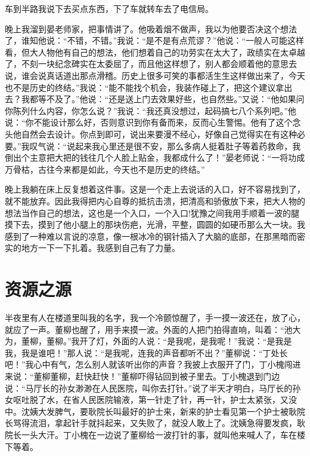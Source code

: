 \documentclass[12pt,oneside]{book}
\begin{document}
车到半路我说下去买点东西，下了车就转车去了电信局。

晚上我溜到晏老师家，把事情讲了。他吸着烟不做声，我以为他要否决这个想法了，谁知他说：``不错，不错。''我说：``是不是有点荒谬？''他说：``一般人可能这样看，但大人物他有自己的想法，他们想着自己的功劳实在太大了，政绩实在太卓越了，不刻一块纪念碑实在太委屈了，而且他这样想了，别人都会顺着他的意思去说，谁会说真话道出那点滑稽。历史上很多可笑的事都活生生这样做出来了，今天也不是历史的终结。''我说：``能不能找个机会，我装作碰上了，把这个建议拿出去？我都等不及了。''他说：``还是送上门去效果好些，也自然些。''又说：``他如果问你陈列什么内容，你怎么说？''我说：``我还真没想过，起码搞七八个系列吧。''他说：``你不能设计那么好，否则意识到你有备而来，反而心生警惕。他有了这个念头他自然会去设计。你点到即可，说出来要漫不经心，好像自己觉得实在有这种必要。''我叹气说：``说起来我心里还是很不安，那么多病人挺着肚子等着药救命，我倒出个主意把大把的钱往几个人脸上贴金，我都成什么了！''晏老师说：``一将功成万骨枯，古往今来都是如此，今天也不是历史的终结。''

晚上我躺在床上反复想着这件事。这是一个走上去说话的入口，好不容易找到了，就不能放弃。因此我得把内心自尊的抵抗击溃，把清高和骄傲放下来，把大人物的想法当作自己的想法，这也是一个入口，一个入口!犹豫之间我用手顺着一波的腿摸下去，摸到了他小腿上的那块伤疤，光滑，平整，圆圆的如硬币那么大一块。我感到了一种难以言说的凉意，像一根冰冷的钢针插入了大脑的底部，在那黑暗而密实的地方一下一下扎着。我感到自己有了力量。


\chapter{资源之源}

半夜里有人在楼道里叫我的名字，我一个冷颤惊醒了，手一摸一波还在，放了心，就应了一声。董柳也醒了，用手来摸一波。外面的人把门拍得直响，叫着：``池大为，董柳，董柳。''我开了灯，外面的人说：``是我呢，是我呢！''我说：``是我是我，我是谁吧！''那人说：``是我呢，连我的声音都听不出？''董柳说：``丁处长吧！''我心中有气，怎么别人就该听出你的声音？我披上衣服开了门，丁小槐闯进来说：``董柳董柳，赶快赶快！''董柳吓得钻回到被子里去。丁小槐退到门边说：``马厅长的孙女渺渺在人民医院，叫你去打针。''说了半天才明白，马厅长的孙女呕吐脱了水，在省人民医院输液，第一针走了针，再一针，护士太紧张，又没中。沈姨大发脾气，要耿院长叫最好的护士来，新来的护士看见第一个护士被耿院长骂得流泪，拿起针手就抖起来，又失败了，就没人敢上了。沈姨急得要发疯，耿院长一头大汗。丁小槐在一边说了董柳给一波打针的事，就叫他来喊人了，车在楼下等着。
\end{document}
